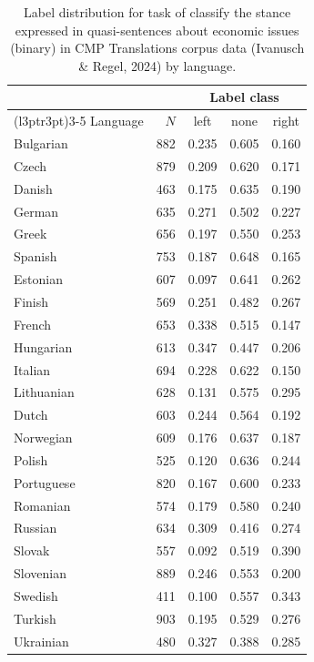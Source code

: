 \begin{table}[!t]

\caption{\label{tab:label_distribution_by_lang_cmp_translations_sample_econ_position}Label distribution for task of classify the stance expressed in quasi-sentences about economic issues (binary) in CMP Translations corpus data (Ivanusch \& Regel, 2024) by language.}
\centering
\fontsize{10}{12}\selectfont
\begin{tabular}[t]{lrccc}
\toprule
\multicolumn{2}{c}{ } & \multicolumn{3}{c}{Label class} \\
\cmidrule(l{3pt}r{3pt}){3-5}
Language & $N$ & left & none & right\\
\midrule
Bulgarian & 882 & 0.235 & 0.605 & 0.160\\
Czech & 879 & 0.209 & 0.620 & 0.171\\
Danish & 463 & 0.175 & 0.635 & 0.190\\
German & 635 & 0.271 & 0.502 & 0.227\\
Greek & 656 & 0.197 & 0.550 & 0.253\\
Spanish & 753 & 0.187 & 0.648 & 0.165\\
Estonian & 607 & 0.097 & 0.641 & 0.262\\
Finish & 569 & 0.251 & 0.482 & 0.267\\
French & 653 & 0.338 & 0.515 & 0.147\\
Hungarian & 613 & 0.347 & 0.447 & 0.206\\
Italian & 694 & 0.228 & 0.622 & 0.150\\
Lithuanian & 628 & 0.131 & 0.575 & 0.295\\
Dutch & 603 & 0.244 & 0.564 & 0.192\\
Norwegian & 609 & 0.176 & 0.637 & 0.187\\
Polish & 525 & 0.120 & 0.636 & 0.244\\
Portuguese & 820 & 0.167 & 0.600 & 0.233\\
Romanian & 574 & 0.179 & 0.580 & 0.240\\
Russian & 634 & 0.309 & 0.416 & 0.274\\
Slovak & 557 & 0.092 & 0.519 & 0.390\\
Slovenian & 889 & 0.246 & 0.553 & 0.200\\
Swedish & 411 & 0.100 & 0.557 & 0.343\\
Turkish & 903 & 0.195 & 0.529 & 0.276\\
Ukrainian & 480 & 0.327 & 0.388 & 0.285\\
\bottomrule
\end{tabular}
\end{table}
